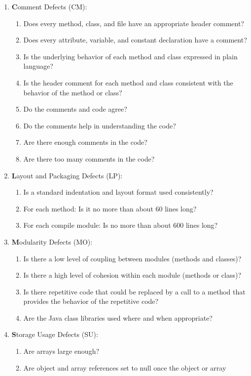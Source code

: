 \begin{enumerate}
\ifslides
\newpage
\fi
\item {\textbf Comment Defects (CM):}
  \begin{enumerate}
  \item Does every method, class, and file have an appropriate header comment?
  \item Does every attribute, variable, and constant declaration have a
  comment?
\item Is the underlying behavior of each method and class expressed in plain
  language?
\item Is the header comment for each method and class consistent with the
  behavior of the method or class?
\item Do the comments and code agree?
\item Do the comments help in understanding the code?
\item Are there enough comments in the code?
\item Are there too many comments in the code?
  \end{enumerate}
\ifslides
\newpage
\fi
\item {\textbf Layout and Packaging Defects (LP):}
  \begin{enumerate}
  \item Is a standard indentation and layout format used consistently?
  \item For each method: Is it no more than about 60 lines long?
  \item For each compile module: Is no more than about 600 lines long?
  \end{enumerate}
\item {\textbf Modularity Defects (MO):}
  \begin{enumerate}
  \item Is there a low level of coupling between modules (methods and
  classes)?
\item Is there a high level of cohesion within each module (methods or class)?
\item Is there repetitive code that could be replaced by a call to a method
  that provides the behavior of the repetitive code?
\item Are the Java class libraries used where and when appropriate?
  \end{enumerate}
\ifslides
\newpage
\fi
\item {\textbf Storage Usage Defects (SU):}
  \begin{enumerate}
  \item Are arrays large enough?
  \item Are object and array references set to null once the object or array

\end{enumerate}
\end{enumerate}

